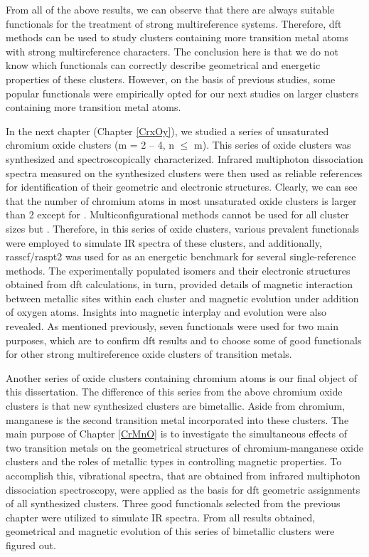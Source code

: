 \begin{refsection}
From all of the above results, we can observe that there are always suitable functionals for the treatment of strong multireference systems. Therefore, \acrshort{dft} methods can be used to study clusters containing more transition metal atoms with strong multireference characters. The conclusion here is that we do not know which functionals can correctly describe geometrical and energetic properties of these clusters. However, on the basis of previous studies, some popular functionals were empirically opted for our next studies on larger clusters containing more transition metal atoms. 



In the next chapter (Chapter \ref{CrxOy}), we studied a series of unsaturated chromium oxide clusters  (m = 2 -- 4, n $\leq$ m). This series of oxide clusters was synthesized and spectroscopically characterized. Infrared multiphoton dissociation spectra measured on the synthesized clusters were then used as reliable references for identification of their geometric and electronic structures. Clearly, we can see that the number of chromium atoms in most unsaturated oxide clusters is larger than 2 except for . Multiconfigurational methods cannot be used for all cluster sizes but . Therefore, in this series of oxide clusters, various prevalent functionals were employed to simulate IR spectra of these clusters, and additionally, \acrshort{rasscf}/\acrshort{raspt2} was used for  as an energetic benchmark for several single-reference methods. The experimentally populated isomers and their electronic structures obtained from \acrshort{dft} calculations, in turn, provided details of magnetic interaction between metallic sites within each cluster and magnetic evolution under addition of oxygen atoms. Insights into magnetic interplay and evolution were also revealed. As mentioned previously, seven functionals were used for two main purposes, which are to confirm \acrshort{dft} results and to choose some of good functionals for other strong multireference oxide clusters of transition metals.  




Another series of oxide clusters containing chromium atoms is our final object of this dissertation. The difference of this series from the above chromium oxide clusters is that new synthesized clusters are bimetallic. Aside from chromium, manganese is the second transition metal incorporated into these clusters. The main purpose of Chapter \ref{CrMnO} is to investigate the simultaneous effects of two transition metals on the geometrical structures of chromium-manganese oxide clusters and the roles of metallic types in controlling magnetic properties. To accomplish this, vibrational spectra, that are obtained from infrared multiphoton dissociation spectroscopy, were applied as the basis for \acrshort{dft} geometric assignments of all synthesized clusters. Three good functionals selected from the previous chapter were utilized to simulate IR spectra. From all results obtained, geometrical and magnetic evolution of this series of bimetallic clusters were figured out.  





\end{refsection}
